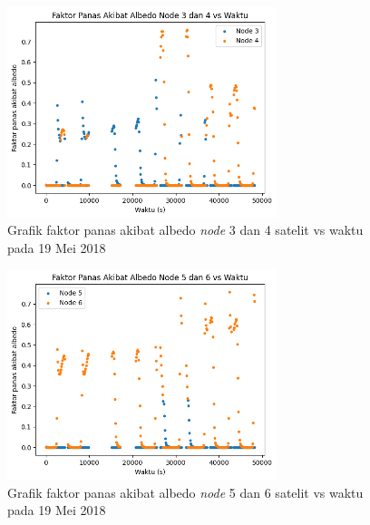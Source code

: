 \begin{figure}[H]
\setlength{}
\begin{center}
\includegraphics[width=0.7\textwidth]{fig/albedo_node34_2018-05-19.png}
	\caption{Grafik faktor panas akibat albedo \textit{node} 3 dan 4 satelit vs waktu pada 19 Mei 2018}
\label{fig:albedo3419}
\end{center}
\end{figure}

\begin{figure}[H]
\setlength{}
\begin{center}
\includegraphics[width=0.7\textwidth]{fig/albedo_node56_2018-05-19.png}
	\caption{Grafik faktor panas akibat albedo \textit{node} 5 dan 6 satelit vs waktu pada 19 Mei 2018}
\label{fig:albedo5619}
\end{center}
\end{figure}

